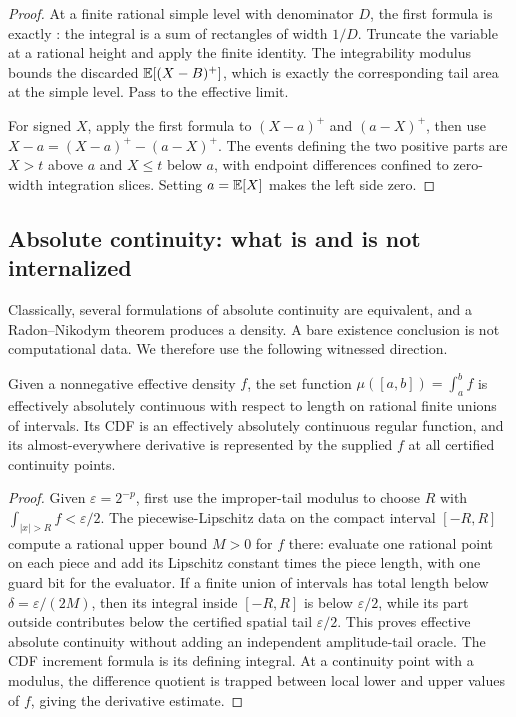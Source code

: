 \begin{proof}
At a finite rational simple level with denominator \(D\), the first formula is
exactly : the integral is a sum of rectangles of
width \(1/D\).  Truncate the variable at a rational height and apply the
finite identity.  The integrability modulus bounds the discarded
\(\mathbb E[(X-B)^+]\), which is exactly the corresponding tail area at the simple
level.  Pass to the effective limit.

For signed \(X\), apply the first formula to \((X-a)^+\) and \((a-X)^+\), then
use \(X-a=(X-a)^+-(a-X)^+\).  The events defining the two positive parts are
\(X>t\) above \(a\) and \(X\le t\) below \(a\), with endpoint differences
confined to zero-width integration slices.  Setting \(a=\mathbb E[X]\) makes the left
side zero.
\end{proof}

\subsection{Absolute continuity: what is and is not internalized}

Classically, several formulations of absolute continuity are equivalent, and a
Radon--Nikodym theorem produces a density.  A bare existence conclusion is not
computational data.  We therefore use the following witnessed direction.

\begin{proposition}
\label{prop:ac-forward}
Given a nonnegative effective density \(f\), the set function
\(\mu([a,b])=\int_a^bf\) is effectively absolutely continuous with respect to
length on rational finite unions of intervals.  Its CDF is an effectively
absolutely continuous regular function, and its almost-everywhere derivative
is represented by the supplied \(f\) at all certified continuity points.
\end{proposition}

\begin{proof}
Given \(\varepsilon=2^{-p}\), first use the improper-tail modulus to choose
\(R\) with \(\int_{|x|>R}f<\varepsilon/2\).  The piecewise-Lipschitz data
on the compact interval \([-R,R]\) compute a rational upper bound \(M>0\)
for \(f\) there: evaluate one rational point on each piece and add its
Lipschitz constant times the piece length, with one guard bit for the evaluator.
If a finite union of intervals has total length below
\(\delta=\varepsilon/(2M)\), then its integral inside \([-R,R]\) is below
\(\varepsilon/2\), while its part outside contributes below the certified
spatial tail \(\varepsilon/2\).  This proves effective absolute continuity
without adding an independent amplitude-tail oracle.  The CDF increment
formula is its defining integral.  At a continuity point with a modulus, the
difference quotient is trapped between local lower and upper values of
\(f\), giving the derivative estimate.
\end{proof}

